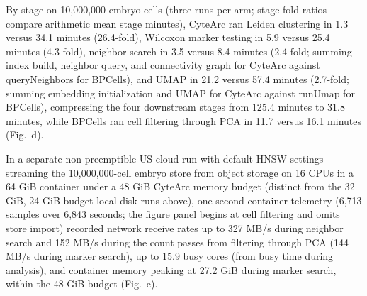 \label{note:Stage profiling and cloud resource trace}

By stage on 10,000,000 embryo cells (three runs per arm; stage fold ratios compare arithmetic mean stage minutes), CyteArc ran Leiden clustering in 1.3 versus 34.1 minutes (26.4-fold), Wilcoxon marker testing in 5.9 versus 25.4 minutes (4.3-fold), neighbor search in 3.5 versus 8.4 minutes (2.4-fold; summing index build, neighbor query, and connectivity graph for CyteArc against queryNeighbors for BPCells), and UMAP in 21.2 versus 57.4 minutes (2.7-fold; summing embedding initialization and UMAP for CyteArc against runUmap for BPCells), compressing the four downstream stages from 125.4 minutes to 31.8 minutes, while BPCells ran cell filtering through PCA in 11.7 versus 16.1 minutes (Fig.~d).

In a separate non-preemptible US cloud run with default HNSW settings streaming the 10,000,000-cell embryo store from object storage on 16 CPUs in a 64 GiB container under a 48 GiB CyteArc memory budget (distinct from the 32 GiB, 24 GiB-budget local-disk runs above), one-second container telemetry (6,713 samples over 6,843 seconds; the figure panel begins at cell filtering and omits store import) recorded network receive rates up to 327 MB/s during neighbor search and 152 MB/s during the count passes from filtering through PCA (144 MB/s during marker search), up to 15.9 busy cores (from  busy time during analysis), and container memory peaking at 27.2 GiB during marker search, within the 48 GiB budget (Fig.~e).

\label{note:Tahoe-100M runs}

